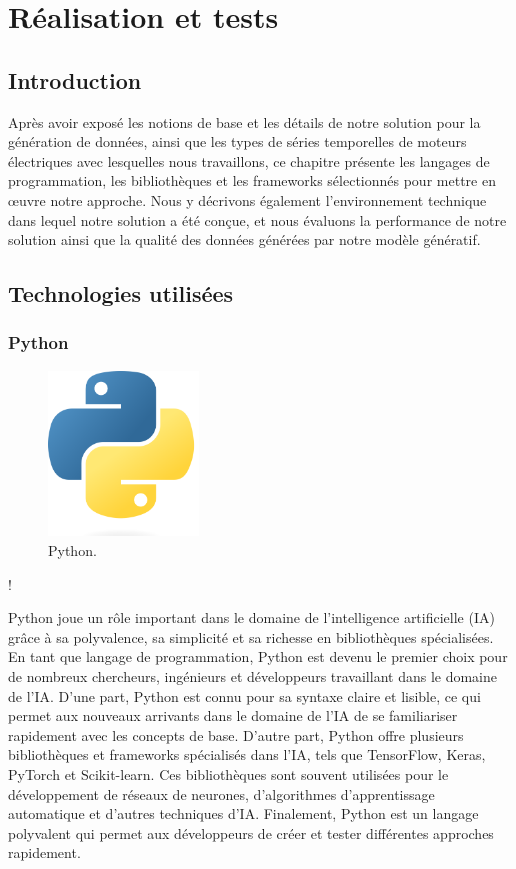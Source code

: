 \chapter{Réalisation et tests}
\section{Introduction}
Après avoir exposé les notions de base et les détails de notre solution pour la
génération de données, ainsi que les types de séries temporelles de moteurs
électriques avec lesquelles nous travaillons, ce chapitre présente les langages
de programmation, les bibliothèques et les frameworks sélectionnés pour mettre
en œuvre notre approche. Nous y décrivons également l'environnement technique
dans lequel notre solution a été conçue, et nous évaluons la performance de
notre solution ainsi que la qualité des données générées par notre modèle
génératif.

\section{Technologies utilisées}
\subsection{Python}

\begin{figure}[hbt!]
  \centering
  \includegraphics[width=4cm]{images_pfe/python.png}
  \caption{Python.}
  \label{fig:python}
\end{figure}
\FloatBarrier
\medskip!

Python joue un rôle important dans le domaine de l'intelligence artificielle
(IA) grâce à sa polyvalence, sa simplicité et sa richesse en bibliothèques
spécialisées. En tant que langage de programmation, Python est devenu le
premier choix pour de nombreux chercheurs, ingénieurs et développeurs
travaillant dans le domaine de l'IA. D'une part, Python est connu pour sa
syntaxe claire et lisible, ce qui permet aux nouveaux arrivants dans le domaine
de l'IA de se familiariser rapidement avec les concepts de base. D'autre part,
Python offre plusieurs bibliothèques et frameworks spécialisés dans l'IA, tels
que TensorFlow, Keras, PyTorch et Scikit-learn. Ces bibliothèques sont souvent
utilisées pour le développement de réseaux de neurones, d'algorithmes
d'apprentissage automatique et d'autres techniques d'IA. Finalement, Python est
un langage polyvalent qui permet aux développeurs de créer et tester
différentes approches rapidement.


